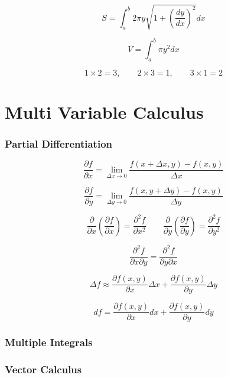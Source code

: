 \documentclass[]{report}
\begin{document}
\begin{equation*}
    S = \int_{a}^{b} 2 \pi y \sqrt{1 + \left(\frac{dy}{dx}\right)^{2}}dx
\end{equation*}

\begin{equation*}
    V = \int_{a}^{b} \pi y^{2} dx
\end{equation*}

\[ 1 \times  2 = 3,\qquad 2\times 3 = 1, \qquad 3\times 1 = 2\]

\part{Multi Variable Calculus}
\section{Partial Differentiation}

\begin{equation*}
    \frac{\partial f}{\partial x} = \lim_{\Delta x \to 0}\frac{f(x + \Delta x, y) - f(x, y)}{\Delta x}
\end{equation*}

\begin{equation*}
    \frac{\partial f}{\partial y} = \lim_{\Delta y \to 0}\frac{f(x, y + \Delta y) - f(x, y)}{\Delta y}
\end{equation*}

\[\frac{\partial}{\partial x}\left(\frac{\partial f}{\partial x}\right) = \frac{\partial^{2}f}{\partial x ^{2}} \qquad \frac{\partial}{\partial y}\left(\frac{\partial f}{\partial y}\right) = \frac{\partial^{2}f}{\partial y ^{2}}\]

\begin{equation*}
    \frac{\partial^{2}f}{\partial x \partial y} = \frac{\partial^{2}f}{\partial y \partial x}
\end{equation*}

\begin{equation*}
    \Delta f \approx \frac{\partial f(x, y)}{\partial x}\Delta x + \frac{\partial f(x, y)}{\partial y}\Delta y
\end{equation*}

\begin{equation*}
    df = \frac{\partial f(x, y)}{\partial x}dx + \frac{\partial f(x, y)}{\partial y}dy
\end{equation*}

\section{Multiple Integrals}
\section{Vector Calculus}
\end{document}
